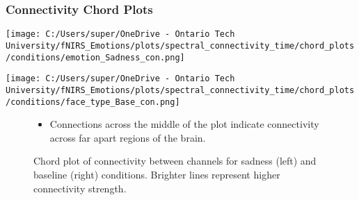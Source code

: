 \documentclass{beamer}
\begin{document}
\begin{frame}
    \frametitle{Connectivity Chord Plots}
    \begin{minipage}[t]{0.45\textwidth}
        \vspace{-\baselineskip}
        \texttt{[image: C:/Users/super/OneDrive - Ontario Tech University/fNIRS\_Emotions/plots/spectral\_connectivity\_time/chord\_plots/conditions/emotion\_Sadness\_con.png]}
    \end{minipage}
    \begin{minipage}[t]{0.45\textwidth}
        \vspace{-\baselineskip}
        \texttt{[image: C:/Users/super/OneDrive - Ontario Tech University/fNIRS\_Emotions/plots/spectral\_connectivity\_time/chord\_plots/conditions/face\_type\_Base\_con.png]}
    \end{minipage}
    \begin{figure}
        \caption{Chord plot of connectivity between channels for sadness (left) and baseline (right) conditions. Brighter lines represent higher connectivity strength.}
        \begin{itemize}
            \item Connections across the middle of the plot indicate connectivity across far apart regions of the brain.
        \end{itemize}
    \end{figure}
\end{frame}
\end{document}
